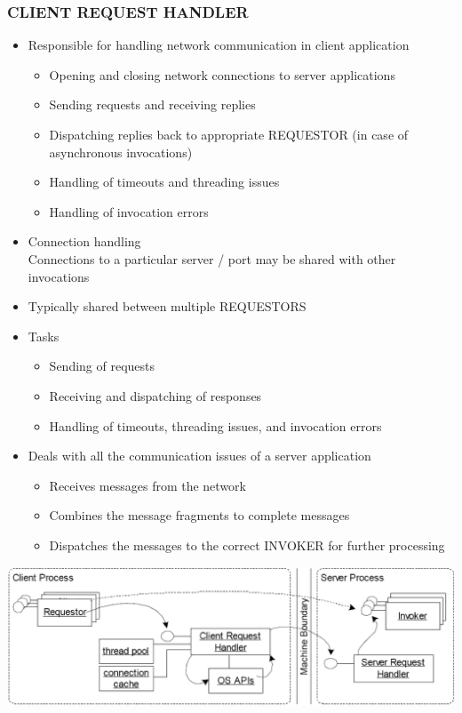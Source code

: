 \documentclass[10pt]{article}
\begin{document}
\subsubsection{CLIENT REQUEST HANDLER}
\begin{itemize}
	\item Responsible for handling network communication in client application
		\begin{itemize}
			\item Opening and closing network connections to server applications
			\item Sending requests and receiving replies
			\item Dispatching replies back to appropriate REQUESTOR (in case of asynchronous invocations)
			\item Handling of timeouts and threading issues
			\item Handling of invocation errors
		\end{itemize}
	\item Connection handling \\
		Connections to a particular server / port may be shared with other invocations
	\item Typically shared between multiple REQUESTORS
	\item Tasks
		\begin{itemize}
			\item Sending of requests
			\item Receiving and dispatching of responses
			\item Handling of timeouts, threading issues, and invocation errors
		\end{itemize}
	\item Deals with all the communication issues of a server application
		\begin{itemize}
			\item Receives messages from the network
			\item Combines the message fragments to complete messages
			\item Dispatches the messages to the correct INVOKER for further processing
		\end{itemize}
\end{itemize}
\begin{center}
	\includegraphics[scale=0.2]{images/client-request-handler.png}
\end{center}
\end{document}
